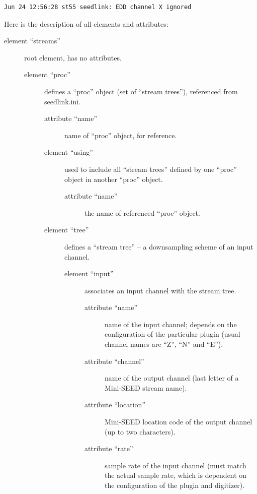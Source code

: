 \documentclass[11pt,a4paper,titlepage]{article}
\begin{document}
\begin{verbatim}
Jun 24 12:56:28 st55 seedlink: EDD channel X ignored
\end{verbatim}

Here is the description of all elements and attributes:
\begin{description}
\item[element ``streams''] root element, has no attributes.

\begin{description}
\item[element ``proc''] defines a ``proc'' object (set of ``stream trees''),
referenced from seedlink.ini.

\begin{description}
\item[attribute ``name''] name of ``proc'' object, for reference.

\item[element ``using''] used to include all ``stream trees'' defined by
one ``proc'' object in another ``proc'' object.

\begin{description}
\item[attribute ``name''] the name of referenced ``proc'' object.

\end{description}

\item[element ``tree''] defines a ``stream tree'' -- a downsampling scheme
of an input channel.

\begin{description}
\item[element ``input''] associates an input channel with the stream tree.

\begin{description}
\item[attribute ``name''] name of the input channel; depends on the
configuration of the particular plugin (usual channel names are ``Z'',
``N'' and ``E'').

\item[attribute ``channel''] name of the output channel (last letter of a
Mini-SEED stream name).

\item[attribute ``location''] Mini-SEED location code of the output channel
(up to two characters).

\item[attribute ``rate''] sample rate of the input channel (must match the
actual sample rate, which is dependent on the configuration of the plugin and
digitizer).
\end{description}


\end{description}
\end{description}
\end{description}
\end{description}
\end{document}
